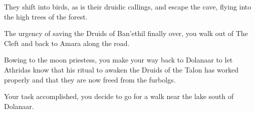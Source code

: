 
They shift into birds, as is their druidic callings, and escape the cave, flying into the high trees of the forest.

The urgency of saving the Druids of Ban'ethil finally over, you walk out of The Cleft and back to Amara along the road.


Bowing to the moon priestess, you make your way back to Dolanaar to let Athridas know that his ritual to awaken the Druids of the Talon has worked properly and that they are now freed from the furbolgs.


Your task accomplished, you decide to go for a walk near the lake south of Dolanaar.

